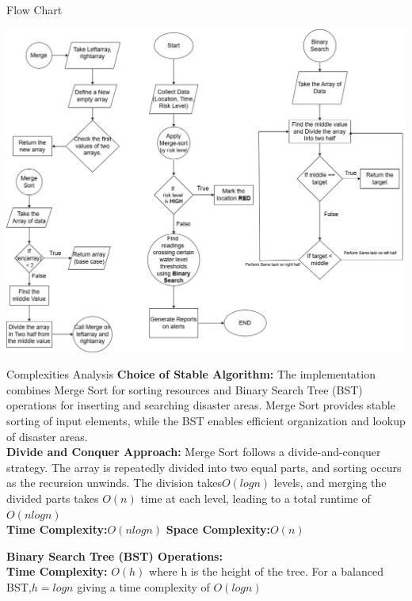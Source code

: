 \documentclass[final]{beamer}
\newlength{\colwidth}
\begin{document}
\begin{frame}[t]
\begin{columns}[t]
\begin{column}{\colwidth}
       		\begin{block}{Flow Chart}
                \centerline{\includegraphics[width=.96\linewidth]{disaster}}
                \centering
                
                \end{block}
                \begin{block}{Complexities Analysis}
                \justifying
                \textbf{Choice of Stable Algorithm:} The implementation combines Merge Sort for sorting resources and Binary Search Tree (BST) operations for inserting and searching disaster areas. Merge Sort provides stable sorting of input elements, while the BST enables efficient organization and lookup of disaster areas.\phantom{This text will be invisible}\\
                \textbf{Divide and Conquer Approach: } Merge Sort follows a divide-and-conquer strategy. The array is repeatedly divided into two equal parts, and sorting occurs as the recursion unwinds. The division takes$O(logn)$  levels, and merging the divided parts takes $O(n)$  time at each level, leading to a total runtime of $O(nlogn)$ \phantom{This text will be invisible}\\
                \textbf{Time Complexity:}$O(nlogn)$
                \textbf{Space Complexity:}$O(n)$

                
                \textbf{Binary Search Tree (BST) Operations: } 
                \phantom{This text will be invisible}\\
                \textbf{  Time Complexity: }$O(h)$ where h is the height of the tree. For a balanced BST,$h  =logn$ giving a time complexity of $O (logn)$
                

\end{block}
\end{column}
\end{columns}
\end{frame}
\end{document}
